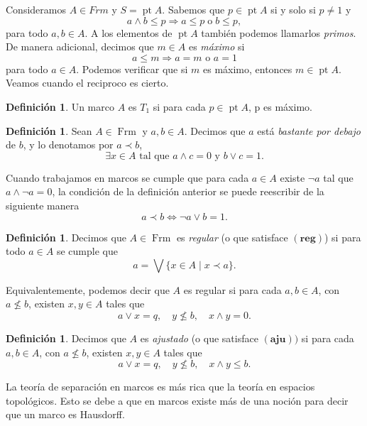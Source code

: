 \documentclass[11pt]{amsart}
\DeclareMathOperator{\pt}{pt}
\DeclareMathOperator{\Frm}{Frm}
\theoremstyle{plain}
\theoremstyle{definition}
\newtheorem{dfn}[thm]{Definición}
\begin{document}
Consideramos $A\in Frm$ y $S=\pt A$. Sabemos que $p\in \pt A$ si y solo si $p\neq 1$ y
\begin{equation}\label{primo}
a\wedge b\leq p \Rightarrow a\leq p \; \text{o}\; b\leq p,
\end{equation}
para todo $a, b\in A$. A los elementos de $\pt A$ también podemos llamarlos \emph{primos}.\\

De manera adicional, decimos que $m\in A$ es \emph{máximo} si 
\[
a\leq m\Rightarrow a=m \text{ o } a=1
\]
para todo $a\in A$. Podemos verificar que si $m$ es máximo, entonces $m\in \pt A$. Veamos cuando el reciproco es cierto.

\begin{dfn}\label{FrmT1}
Un marco $A$ es $T_1$ si para cada $p\in \pt A$, p es máximo.
\end{dfn}

\begin{dfn}\label{Bpordebajo}
Sean $A\in \Frm$ y $a, b\in A$. Decimos que $a$ está \emph{bastante por debajo} de $b$, y lo denotamos por $a\prec b$, 
\[
\exists x\in A\text{ tal que }a\wedge c=0 \text{ y }b\vee c=1.
\]
\end{dfn}

Cuando trabajamos en marcos se cumple que para cada $a\in A$ existe $\neg a$ tal que $a\wedge \neg a=0$, la condición de la definición anterior 
se puede reescribir de la siguiente manera
\[
a\prec b\iff \neg a\vee b=1.
\]

\begin{dfn}\label{reg}
Decimos que $A\in \Frm$ es \emph{regular} (o que satisface $\mathbf{(reg)}$) si para todo $a\in A$ se cumple que
\[
a=\bigvee\{x\in A\mid x\prec a\}.
\]
\end{dfn}

Equivalentemente, podemos decir que $A$ es regular si para cada $a, b\in A$, con $a\nleq b$, existen $x, y\in A$
tales que 
\[
a\vee x=q, \quad y\nleq b, \quad x\wedge y=0.
\]

\begin{dfn}\label{aju}
Decimos que $A$ es \emph{ajustado} (o que satisface $\mathbf{(aju)})$ si para cada $a, b\in A$, con $a\nleq b$, existen $x, y\in A$
tales que 
\[
a\vee x=q, \quad y\nleq b, \quad x\wedge y\leq b.
\]
\end{dfn}

La teoría de separación en marcos es más rica que la teoría en espacios topológicos. Esto se debe a que en marcos existe más de una noción para decir
que un marco es Hausdorff.
\end{document}
